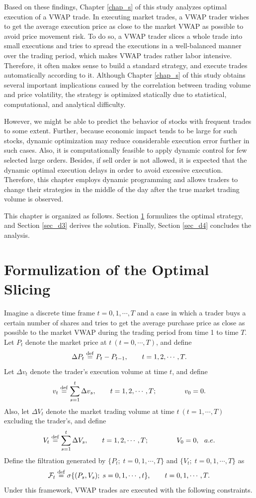 Based on these findings, Chapter \ref{chap_s} of this study analyzes optimal 
execution of a VWAP trade.  In executing market trades, a VWAP trader wishes to 
get the average execution price as close to the market VWAP as possible to avoid 
price movement risk.  To do so, a VWAP trader slices a whole trade into small 
executions and tries to spread the executions in a well-balanced manner over the 
trading period, which makes VWAP trades rather labor intensive.  Therefore, it 
often makes sense to build a standard strategy, and execute trades automatically 
according to it.  Although Chapter \ref{chap_s} of this study obtains several 
important implications caused by the correlation between trading volume and 
price volatility, the strategy is optimized statically due to statistical, 
computational, and analytical difficulty.  

However, we might be able to predict the behavior of stocks with frequent trades 
to some extent.  Further, because economic impact tends to be large for such 
stocks, dynamic optimization may reduce considerable execution error further in 
such cases.  Also, it is computationally feasible to apply dynamic control for 
few selected large orders.  Besides, if sell order is not allowed, it is expected that the dynamic optimal execution delays in order to avoid excessive execution.  Therefore, this chapter employs dynamic programming 
and allows traders to change their strategies in the middle of the day after the 
true market trading volume is observed.  

This chapter is organized as follows.  Section \ref{sec_d2} formulizes the 
optimal strategy, and Section \ref{sec_d3} derives the solution.  Finally, 
Section \ref{sec_d4} concludes the analysis.

\section{Formulization of the Optimal Slicing}\label{sec_d2}
Imagine a discrete time frame $t=0,1,\cdots,T$ and a case in which a trader buys 
a certain number of shares and tries to get the average purchase price as close 
as possible to the market VWAP during the trading period from time 1 to time 
$T$.  Let $P_t$ denote the market price at $t\ (t=0,\cdots,T)$, and define
\[
  \Delta P_t \stackrel{\mathrm{def}}{=} P_t-P_{t-1}, \qquad t=1,2,\cdots,T.
\]
Let $\Delta v_t$ denote the trader's execution volume at time $t$, and define
\[
  v_t \stackrel{\mathrm{def}}{=} \sum_{s=1}^t \Delta v_s, \qquad t=1,2,\cdots,T; \qquad\qquad 
v_0=0.
\]
Also, let $\Delta V_t$ denote the market trading volume at time $t\ 
(t=1,\cdots,T)$ excluding the trader's, and define
\[
  V_t \stackrel{\mathrm{def}}{=} \sum_{s=1}^t \Delta V_s, \qquad t=1,2,\cdots,T; \qquad\qquad 
V_0=0,\ \ a.e.
\]
Define the filtration generated by $\{ P_t;\; t=0,1,\cdots,T \}$ and $\{ V_t;\; 
t=0,1,\cdots,T \}$ as
\[
  {\cal F}_t \stackrel{\mathrm{def}}{=} \sigma \{ (P_s, V_s); \; s=0,1,\cdots, t \}, \qquad 
t=0,1,\cdots,T.
\]
Under this framework, VWAP trades are executed with the following constraints.

